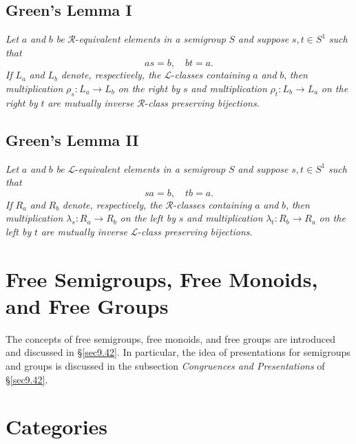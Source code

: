 \documentclass{surv-l}
\numberwithin{equation}{section}
\numberwithin{table}{section}
\numberwithin{figure}{section}
\theoremstyle{definition}
\begin{document}
\subsection{Green's Lemma I}\label{subsecA.77.1}

\emph{Let} $a$ \emph{and} $b$ \emph{be}
$\mathcal{R}$-\emph{equivalent elements in a semigroup} $S$
\emph{and suppose} $s, t\in S^{1}$ \emph{such that}
\[
as=b,\quad bt=a.
\]
\emph{If} $L_{a}$ \emph{and} $L_{b}$ \emph{denote, respectively,
the} $\mathcal{L}$-\emph{classes containing} $a$ \emph{and} $b$,
\emph{then multiplication} $\rho_{s} : L_{a}\rightarrow L_{b}$
\emph{on the right by} $s$ \emph{and multiplication} $\rho_{t} :
L_{b}\rightarrow L_{a}$ \emph{on the right by} $t$ \emph{are
mutually inverse} $\mathcal{R}$-\emph{class preserving
bijections}.

\subsection{Green's Lemma II}\label{subsecA.77.2}

\emph{Let} $a$ \emph{and} $b$ \emph{be}
$\mathcal{L}$-\emph{equivalent elements in a semigroup} $S$
\emph{and suppose} $s, t\in S^{1}$ \emph{such that}
\[
sa=b,\quad tb=a.
\]
\emph{If} $R_{a}$ \emph{and} $R_{b}$ \emph{denote, respectively,
the} $\mathcal{R}$-\emph{classes containing} $a$ \emph{and} $b$,
\emph{then multiplication} $\lambda_{s} : R_{a}\rightarrow R_{b}$
\emph{on the left by} $s$ \emph{and multiplication} $\lambda_{t} :
R_{b}\rightarrow R_{a}$ \emph{on the left by} $t$ \emph{are
mutually inverse} $\mathcal{L}$-\emph{class preserving
bijections}.

\section{Free Semigroups, Free Monoids, and Free Groups}\label{secA.78}

The concepts of free semigroups, free monoids, and free groups are
introduced and discussed in \S\ref{sec9.42}. In particular, the
idea of presentations for semigroups and groups is discussed in
the subsection \emph{Congruences and Presentations}
of \S\ref{sec9.42}.

\section{Categories}\label{secA.79}
\end{document}

